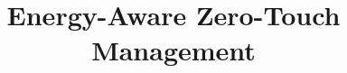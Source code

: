 \documentclass[conference]{IEEEtran}
\begin{document}
\frenchspacing
\renewcommand{\baselinestretch}{0.87}

\title{Energy-Aware Zero-Touch Management}


\maketitle

% 



% 



\end{document}
